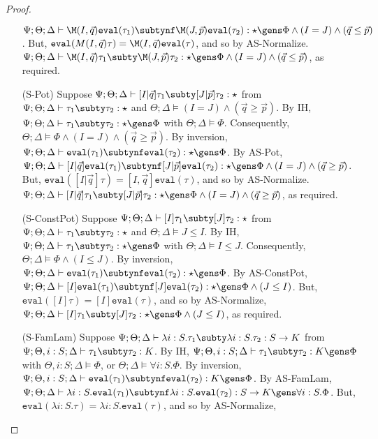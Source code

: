 \begin{proof}
\begin{itemize}
   $\Psi ; \Theta ; \Delta \vdash \M(I,\vec{q})\texttt{eval}(\tau_1) \subtynf \M(J,\vec{p})\texttt{eval}(\tau_2) : \star \gens \Phi \wedge (I = J) \wedge (\vec{q} \leq \vec{p})$. But, $\texttt{eval}(M(I,\vec{q})\tau)=\M(I,\vec{q})\texttt{eval}(\tau)$, and so by AS-Normalize.
   $\Psi ; \Theta ; \Delta \vdash \M(I,\vec{q}) \tau_1 \subty \M(J,\vec{p}) \tau_2 : \star \gens \Phi \wedge (I = J) \wedge (\vec{q} \leq \vec{p})$, as required.
   \item[(S-Pot)] Suppose $\Psi ; \Theta ; \Delta \vdash [I|\vec{q}] \tau_1 \subty [J|\vec{p}] \tau_2 : \star$ from $\Psi ; \Theta ; \Delta \vdash \tau_1 \subty \tau_2 : \star$ and $\Theta ; \Delta \vDash (I = J) \wedge (\vec{q} \geq \vec{p})$. By IH, $\Psi ; \Theta ; \Delta \vdash \tau_1 \subty \tau_2 : \star \gens \Phi$ with $\Theta ; \Delta \vDash \Phi$. Consequently, $\Theta ; \Delta \vDash \Phi \wedge (I = J) \wedge (\vec{q} \geq \vec{p})$. By inversion,
   $\Psi ; \Theta ; \Delta \vdash \texttt{eval}(\tau_1) \subtynf \texttt{eval}(\tau_2) : \star \gens \Phi$. By AS-Pot,
   $\Psi ; \Theta ; \Delta \vdash [I|\vec{q}]\texttt{eval}(\tau_1) \subtynf [J|\vec{p}]\texttt{eval}(\tau_2) : \star \gens \Phi \wedge (I = J) \wedge (\vec{q} \geq \vec{p})$. But, $\texttt{eval}([I|\vec{q}]\tau)=[I,\vec{q}]\texttt{eval}(\tau)$, and so by AS-Normalize.
   $\Psi ; \Theta ; \Delta \vdash [I|\vec{q}] \tau_1 \subty [J|\vec{p}] \tau_2 : \star \gens \Phi \wedge (I = J) \wedge (\vec{q} \geq \vec{p})$, as required.
   \item[(S-ConstPot)] Suppose $\Psi ; \Theta ; \Delta \vdash [I] \tau_1 \subty [J] \tau_2 : \star$
   from $\Psi ; \Theta ; \Delta \vdash \tau_1 \subty \tau_2 : \star$ and $\Theta;\Delta \vDash J \leq I$.
   By IH, $\Psi ; \Theta ; \Delta \vdash \tau_1 \subty \tau_2 : \star \gens \Phi$ with $\Theta ; \Delta \vDash I \leq J$. Consequently, $\Theta ; \Delta \vDash \Phi \wedge (I \leq J)$. By inversion, $\Psi ; \Theta ; \Delta \vdash \texttt{eval}(\tau_1) \subtynf \texttt{eval}(\tau_2) : \star \gens \Phi$. By AS-ConstPot,
   $\Psi ; \Theta ; \Delta \vdash [I]\texttt{eval}(\tau_1) \subtynf [J]\texttt{eval}(\tau_2) : \star \gens \Phi \wedge (J \leq I)$. But, $\texttt{eval}([I] \tau) = [I]\texttt{eval}(\tau)$, and so by AS-Normalize, $\Psi ; \Theta ; \Delta \vdash [I] \tau_1 \subty [J] \tau_2 : \star \gens \Phi \wedge (J \leq I)$, as required.
   \item[(S-FamLam)] Suppose $\Psi ; \Theta ; \Delta \vdash \lambda i : S. \tau_1 \subty \lambda i : S. \tau_2 : S \to K$
   from $\Psi ; \Theta, i : S ; \Delta \vdash \tau_1 \subty \tau_2 : K$. By IH, $\Psi ; \Theta, i : S ; \Delta \vdash \tau_1 \subty \tau_2 : K \gens \Phi$ with $\Theta, i : S; \Delta \vDash \Phi$, or $\Theta ; \Delta \vDash \forall i : S. \Phi$. By inversion, $\Psi ; \Theta, i : S ; \Delta \vdash \texttt{eval}(\tau_1) \subtynf \texttt{eval}(\tau_2) : K \gens \Phi$. By AS-FamLam, $\Psi ; \Theta ; \Delta \vdash \lambda i : S . \texttt{eval}(\tau_1) \subtynf \lambda i : S.\texttt{eval}(\tau_2) : S \to K \gens \forall i : S. \Phi$. But, $\texttt{eval}(\lambda i : S. \tau) = \lambda i : S. \texttt{eval}(\tau)$, and so by AS-Normalize,

\end{itemize}
\end{proof}
